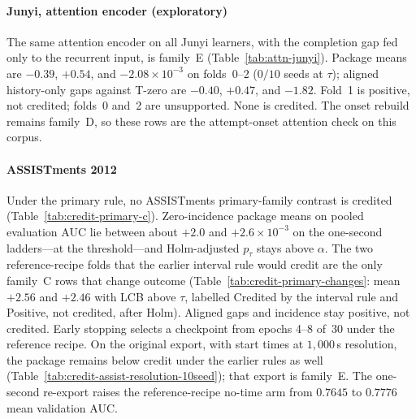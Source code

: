 \documentclass[review,12pt]{elsarticle}
\begin{document}


\paragraph{Junyi, attention encoder (exploratory)}
The same attention encoder on all Junyi learners, with the completion
gap fed only to the recurrent input, is family~E
(Table~\ref{tab:attn-junyi}). Package means are $-0.39$, $+0.54$, and
$-2.08\times 10^{-3}$ on folds~0--2 ($0/10$ seeds at $\tau$); aligned
history-only gaps against T-zero are $-0.40$, $+0.47$, and $-1.82$.
Fold~1 is positive, not credited; folds~0 and~2 are unsupported. None
is credited. The onset rebuild remains family~D, so these rows are the
attempt-onset attention check on this corpus.



\paragraph{ASSISTments 2012}
Under the primary rule, no ASSISTments primary-family contrast is
credited (Table~\ref{tab:credit-primary-c}). Zero-incidence package
means on pooled evaluation AUC lie between about $+2.0$ and
$+2.6\times 10^{-3}$ on the one-second ladders---at the
threshold---and Holm-adjusted $p_\tau$ stays above $\alpha$. The two
reference-recipe folds that the earlier interval rule would credit are
the only family~C rows that change outcome
(Table~\ref{tab:credit-primary-changes}: mean $+2.56$ and $+2.46$ with
LCB above $\tau$, labelled Credited by the interval rule and Positive,
not credited, after Holm). Aligned gaps and incidence
stay positive, not credited. Early stopping selects a checkpoint from
epochs 4--8 of~30 under the reference recipe. On the original export,
with start times at $1{,}000$\,s resolution, the package remains below
credit under the earlier rules as well
(Table~\ref{tab:credit-assist-resolution-10seed}); that export is
family~E. The one-second re-export raises the reference-recipe no-time
arm from $0.7645$ to $0.7776$ mean validation AUC.


\end{document}
